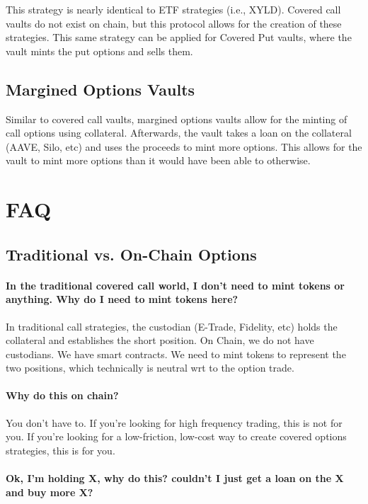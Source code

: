 \documentclass[%
 reprint,
 amsmath,amssymb,
 aps,
]{revtex4-2}
\begin{document}
This strategy is nearly identical to ETF strategies (i.e., XYLD). Covered
call vaults do not exist on chain, but this protocol allows for the
creation of these strategies. This same strategy can be applied for
Covered Put vaults, where the vault mints the put options and sells
them.

\subsection{Margined Options Vaults}

Similar to covered call vaults, margined options vaults allow for the
minting of call options using collateral. Afterwards, the vault takes a
loan on the collateral (AAVE, Silo, etc) and uses the proceeds to mint
more options. This allows for the vault to mint more options than it
would have been able to otherwise.

\section{\label{sec:faq}FAQ}

\subsection{Traditional vs. On-Chain Options}

\paragraph{In the traditional covered call world, I don't need to mint
tokens or anything. Why do I need to mint tokens here?}

In traditional call strategies, the custodian (E-Trade, Fidelity, etc)
holds the collateral and establishes the short position. On Chain, we do
not have custodians. We have smart contracts. We need to mint tokens to
represent the two positions, which technically is neutral wrt to the
option trade.

\paragraph{Why do this on chain?}

You don't have to. If you're looking for high frequency trading, this is
not for you. If you're looking for a low-friction, low-cost way to
create covered options strategies, this is for you.

\paragraph{Ok, I'm holding X, why do this? couldn't I just get a loan on
the X and buy more X?}
\end{document}
